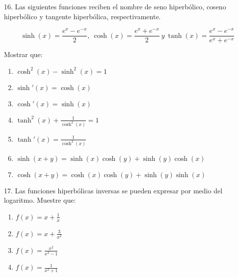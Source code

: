 \documentclass[12pt]{article}
\begin{document}
16. Las siguientes funciones reciben el nombre de seno hiperb\'olico, coseno hiperb\'olico y tangente hiperb\'olica, respectivamente.

\begin{equation*}
    \sinh(x)=\frac{e^x-e^{-x}}{2}, \ \cosh(x)=\frac{e^x+e^{-x}}{2} \ y \ \tanh(x)=\frac{e^x-e^{-x}}{e^x+e^{-x}}
\end{equation*}

Mostrar que:

\begin{enumerate}[\hspace{9px} a)]
    \item \(\cosh^2(x)-\sinh^2(x)=1\)
    
    \item \(\sinh'(x)=\cosh(x)\)
    
    \item \(\cosh'(x)=\sinh(x)\)
    
    \item \(\tanh^2(x)+\displaystyle\frac{1}{\cosh^2(x)}=1\)
    
    \item \(\tanh'(x)=\displaystyle\frac{1}{\cosh^2(x)}\)
    
    \item \(\sinh(x+y)=\sinh(x)\cosh(y)+\sinh(y)\cosh(x)\)
    
    \item \(\cosh(x+y)=\cosh(x)\cosh(y)+\sinh(y)\sinh(x)\)

\end{enumerate}

17. Las funciones hiperb\'olicas inversas se pueden expresar por medio del logaritmo. Muestre que:

\begin{enumerate}[\hspace{9px} a)]
    \item \(f(x)=x+\displaystyle\frac{1}{x}\)
    
    \item \(f(x)=x+\displaystyle\frac{3}{x^2}\)
    
    \item \(f(x)=\displaystyle\frac{x^2}{x^2-1}\)
    
    \item \(f(x)=\displaystyle\frac{1}{x^2+1}\)

\end{enumerate}
\end{document}
